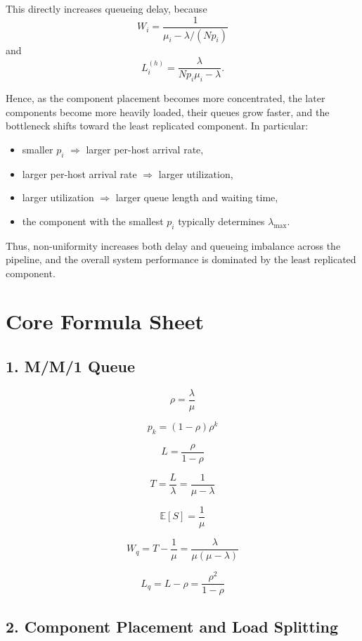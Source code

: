 \documentclass[12pt,a4paper]{article}
\begin{document}
This directly increases queueing delay, because
\[
W_i = \frac{1}{\mu_i - \lambda/(Np_i)}
\]
and
\[
L_i^{(h)} = \frac{\lambda}{Np_i\mu_i - \lambda}.
\]

Hence, as the component placement becomes more concentrated, the later components become more heavily loaded, their queues grow faster, and the bottleneck shifts toward the least replicated component. In particular:
\begin{itemize}
    \item smaller $p_i$ $\Rightarrow$ larger per-host arrival rate,
    \item larger per-host arrival rate $\Rightarrow$ larger utilization,
    \item larger utilization $\Rightarrow$ larger queue length and waiting time,
    \item the component with the smallest $p_i$ typically determines $\lambda_{\max}$.
\end{itemize}

Thus, non-uniformity increases both delay and queueing imbalance across the pipeline, and the overall system performance is dominated by the least replicated component.

\newpage
\section{Core Formula Sheet}

\subsection*{1. M/M/1 Queue}

\[
\rho = \frac{\lambda}{\mu}
\]

\[
p_k = (1-\rho)\rho^k
\]

\[
L = \frac{\rho}{1-\rho}
\]

\[
T = \frac{L}{\lambda} = \frac{1}{\mu - \lambda}
\]

\[
\mathbb{E}[S] = \frac{1}{\mu}
\]

\[
W_q = T - \frac{1}{\mu}
    = \frac{\lambda}{\mu(\mu-\lambda)}
\]

\[
L_q = L - \rho
    = \frac{\rho^2}{1-\rho}
\]

\subsection*{2. Component Placement and Load Splitting}
\end{document}
